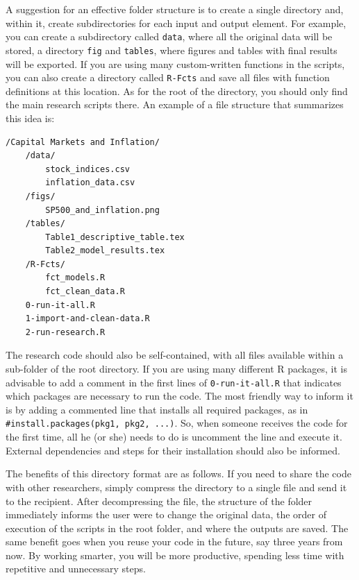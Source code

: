 \documentclass[
  12pt,
]{book}
\begin{document}
A suggestion for an effective folder structure is to create a single directory and, within it, create subdirectories for each input and output element. For example, you can create a subdirectory called \texttt{data}, where all the original data will be stored, a directory \texttt{fig} and \texttt{tables}, where figures and tables with final results will be exported. If you are using many custom-written functions in the scripts, you can also create a directory called \texttt{R-Fcts} and save all files with function definitions at this location. As for the root of the directory, you should only find the main research scripts there. An example of a file structure that summarizes this idea is: 

\begin{verbatim}
/Capital Markets and Inflation/
    /data/
        stock_indices.csv
        inflation_data.csv
    /figs/
        SP500_and_inflation.png
    /tables/
        Table1_descriptive_table.tex
        Table2_model_results.tex
    /R-Fcts/
        fct_models.R
        fct_clean_data.R
    0-run-it-all.R
    1-import-and-clean-data.R
    2-run-research.R
\end{verbatim}

The research code should also be self-contained, with all files available within a sub-folder of the root directory. If you are using many different R packages, it is advisable to add a comment in the first lines of \texttt{0-run-it-all.R} that indicates which packages are necessary to run the code. The most friendly way to inform it is by adding a commented line that installs all required packages, as in \texttt{\#install.packages(\textquotesingle{}pkg1\textquotesingle{},\ \textquotesingle{}pkg2\textquotesingle{},\ ...)}. So, when someone receives the code for the first time, all he (or she) needs to do is uncomment the line and execute it. External dependencies and steps for their installation should also be informed.

The benefits of this directory format are as follows. If you need to share the code with other researchers, simply compress the directory to a single file and send it to the recipient. After decompressing the file, the structure of the folder immediately informs the user were to change the original data, the order of execution of the scripts in the root folder, and where the outputs are saved. The same benefit goes when you reuse your code in the future, say three years from now. By working smarter, you will be more productive, spending less time with repetitive and unnecessary steps.
\end{document}
